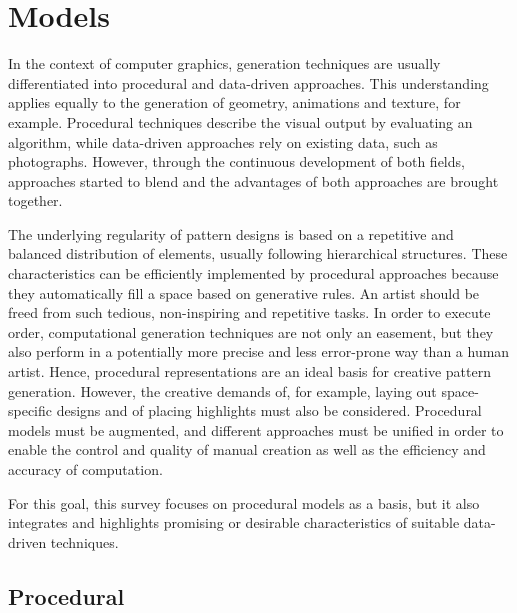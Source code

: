 

\section{Models}
\label{sec:models}

In the context of computer graphics, generation techniques are usually differentiated into procedural and data-driven approaches. This understanding applies equally to the generation of geometry, animations and texture, for example. Procedural techniques describe the visual output by evaluating an algorithm, while data-driven approaches rely on existing data, such as photographs. However, through the continuous development of both fields, approaches started to blend and the advantages of both approaches are brought together. 
 
The underlying regularity of pattern designs is based on a repetitive and balanced distribution of elements, usually following hierarchical structures. These characteristics can be efficiently implemented by procedural approaches \cite{stava_2010_ipm} because they automatically fill a space based on generative rules. An artist should be freed from such tedious, non-inspiring and repetitive tasks. In order to execute order, computational generation techniques are not only an easement, but they also perform in a potentially more precise and less error-prone way than a human artist. Hence, procedural representations are an ideal basis for creative pattern generation. However, the creative demands of, for example, laying out space-specific designs and of placing highlights must also be considered. Procedural models must be augmented, and different approaches must be unified in order to enable the control and quality of manual creation as well as the efficiency and accuracy of computation. 

For this goal, this survey focuses on procedural models as a basis, but it also integrates and highlights promising or desirable characteristics of suitable data-driven techniques.


\subsection{Procedural}
\label{subsec:models_procedural}

